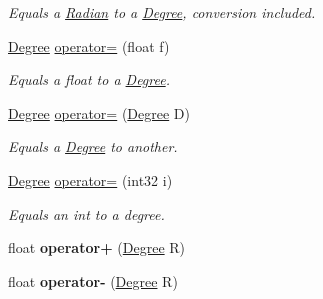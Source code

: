 \begin{DoxyCompactItemize}
\begin{DoxyCompactList}\small\item\em Equals a \hyperlink{classrcz_engine_1_1_radian}{Radian} to a \hyperlink{classrcz_engine_1_1_degree}{Degree}, conversion included. \end{DoxyCompactList}\item 
\hypertarget{classrcz_engine_1_1_degree_acf32cab3c8942a2613ebbf1c27414f01}{}\hyperlink{classrcz_engine_1_1_degree}{Degree} \hyperlink{classrcz_engine_1_1_degree_acf32cab3c8942a2613ebbf1c27414f01}{operator=} (float f)\label{classrcz_engine_1_1_degree_acf32cab3c8942a2613ebbf1c27414f01}

\begin{DoxyCompactList}\small\item\em Equals a float to a \hyperlink{classrcz_engine_1_1_degree}{Degree}. \end{DoxyCompactList}\item 
\hypertarget{classrcz_engine_1_1_degree_aeb60536625f96b2999e2eb324489f4e9}{}\hyperlink{classrcz_engine_1_1_degree}{Degree} \hyperlink{classrcz_engine_1_1_degree_aeb60536625f96b2999e2eb324489f4e9}{operator=} (\hyperlink{classrcz_engine_1_1_degree}{Degree} D)\label{classrcz_engine_1_1_degree_aeb60536625f96b2999e2eb324489f4e9}

\begin{DoxyCompactList}\small\item\em Equals a \hyperlink{classrcz_engine_1_1_degree}{Degree} to another. \end{DoxyCompactList}\item 
\hypertarget{classrcz_engine_1_1_degree_a92df9ef3cd2110d879b77155d9e52ce0}{}\hyperlink{classrcz_engine_1_1_degree}{Degree} \hyperlink{classrcz_engine_1_1_degree_a92df9ef3cd2110d879b77155d9e52ce0}{operator=} (int32 i)\label{classrcz_engine_1_1_degree_a92df9ef3cd2110d879b77155d9e52ce0}

\begin{DoxyCompactList}\small\item\em Equals an int to a degree. \end{DoxyCompactList}\item 
\hypertarget{classrcz_engine_1_1_degree_a4b06940b5ad97cd699a18727c6e7abe8}{}float {\bfseries operator+} (\hyperlink{classrcz_engine_1_1_degree}{Degree} R)\label{classrcz_engine_1_1_degree_a4b06940b5ad97cd699a18727c6e7abe8}

\item 
\hypertarget{classrcz_engine_1_1_degree_a1d3335c2d18055e12f52404162d6024f}{}float {\bfseries operator-\/} (\hyperlink{classrcz_engine_1_1_degree}{Degree} R)\label{classrcz_engine_1_1_degree_a1d3335c2d18055e12f52404162d6024f}


\end{DoxyCompactItemize}
